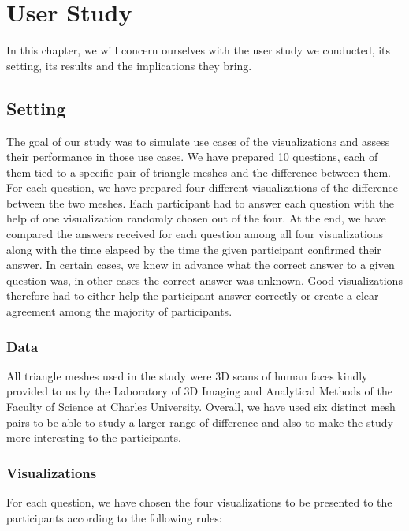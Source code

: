 \chapter{User Study}

In this chapter, we will concern ourselves with the user study we conducted, its setting, its results and the implications they bring.

\section{Setting}

The goal of our study was to simulate use cases of the visualizations and assess their performance in those use cases. We have prepared 10 questions, each of them tied to a specific pair of triangle meshes and the difference between them. For each question, we have prepared four different visualizations of the difference between the two meshes. Each participant had to answer each question with the help of one visualization randomly chosen out of the four. At the end, we have compared the answers received for each question among all four visualizations along with the time elapsed by the time the given participant confirmed their answer. In certain cases, we knew in advance what the correct answer to a given question was, in other cases the correct answer was unknown. Good visualizations therefore had to either help the participant answer correctly or create a clear agreement among the majority of participants.

\subsection{Data}

All triangle meshes used in the study were 3D scans of human faces kindly provided to us by the Laboratory of 3D Imaging and Analytical Methods of the Faculty of Science at Charles University. Overall, we have used six distinct mesh pairs to be able to study a larger range of difference and also to make the study more interesting to the participants.

\subsection{Visualizations}

For each question, we have chosen the four visualizations to be presented to the participants according to the following rules:

